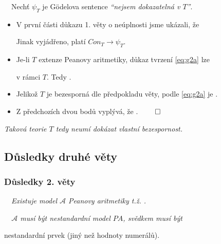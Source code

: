     \ \ Nechť $\psi_T$ je Gödelova sentence {\it ``nejsem dokazatelná v $T$''}.
    \begin{itemize}
    \item V první části důkazu 1. věty o neúplnosti jsme ukázali, že

    

    Jinak vyjádřeno, platí $Con_T\to \psi_T$.

    
    \item Je-li $T$ extenze Peanovy aritmetiky, důkaz tvrzení \eqref{eq:g2a} lze 

    
    v rámci $T$. Tedy .

    
    \item Jelikož $T$ je bezesporná dle předpokladu věty, podle \eqref{eq:g2a} je
    .

    
    \item Z předchozích dvou bodů vyplývá, že . $\qed$
    \end{itemize}
    \smallskip
    
    {\it {} Taková teorie $T$ tedy neumí dokázat vlastní bezespornost.}
    
    


\subsection{Důsledky druhé věty}\todo

\subsubsection*{Důsledky 2. věty}
    \ \ {\it Existuje model $\mathcal{A}$ Peanovy aritmetiky t.ž. .}
    \medskip
    
    {\it {}\ \ $\mathcal{A}$ musí být nestandardní model $PA$, svědkem musí být
    \smallskip
    
    nestandardní prvek (jiný než hodnoty numerálů).}
    \bigskip
    
    
